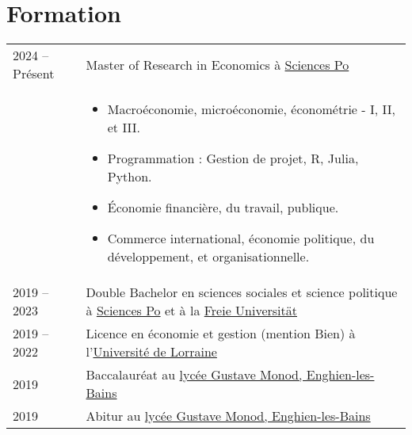 \documentclass[a4paper,12pt]{article}
\begin{document}
\section{Formation}
\begin{tabularx}{\linewidth}{@{}l X@{}}	

2024 – Présent & Master of Research in Economics à \href{https://www.sciencespo.fr/en/}{Sciences Po} \\ 
& \begin{itemize}
    \item Macroéconomie, microéconomie, économétrie - I, II, et III.
    \item Programmation : Gestion de projet, R, Julia, Python.
    \item Économie financière, du travail, publique.
    \item Commerce international, économie politique, du développement, et organisationnelle.
\end{itemize} \\

2019 – 2023 & Double Bachelor en sciences sociales et science politique à \href{https://www.sciencespo.fr/en/}{Sciences Po} et à la \href{https://www.fu-berlin.de/en/index.html}{Freie Universität}\\

2019 – 2022 & Licence en économie et gestion (mention Bien) à l'\href{https://www.univ-lorraine.fr/en/}{Université de Lorraine}\\

2019 & Baccalauréat au \href{https://www.lyc-polyvalent-monod-enghien.fr/}{lycée Gustave Monod, Enghien-les-Bains} \hfill \\

2019 & Abitur au \href{https://www.lyc-polyvalent-monod-enghien.fr/}{lycée Gustave Monod, Enghien-les-Bains} \hfill \\
\end{tabularx}

\end{document}
